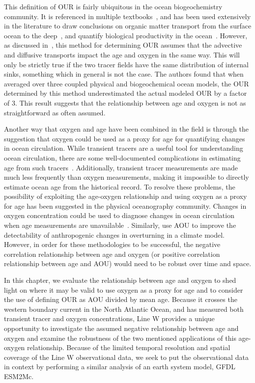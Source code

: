 This definition of OUR is fairly ubiquitous in the ocean biogeochemistry
community. It is referenced in multiple textbooks~\citep{Sarmiento2006,Emerson2008},
and has been used extensively in the literature to draw conclusions on organic
matter transport from the surface ocean to the deep~\citep{Jenkins}, and quantify
biological productivity in the ocean~\citep{Burd2010}. However, as discussed
in~\citet{Koeve2016}, this method for determining OUR assumes that the advective
and diffusive transports impact the age and oxygen in the same way. This will
only be strictly true if the two tracer fields have the same distribution of
internal sinks, something which in general is not the case. The authors found
that when averaged over three coupled physical and biogeochemical ocean models,
the OUR determined by this method underestimated the actual modeled OUR by a
factor of 3. This result suggests that the relationship between age and oxygen
is not as straightforward as often assumed.

Another way that oxygen and age have been combined in the field is through the
suggestion that oxygen could be used as a proxy for age for quantifying changes
in ocean circulation. While transient tracers are a useful tool for understanding
ocean circulation, there are some well-documented complications in estimating age
from such tracers~\citep{Haine2002}. Additionally, transient tracer
measurements are made much less frequently than oxygen measurements, making it
impossible to directly estimate ocean age from the historical record. To resolve
these problems, the possibility of exploiting the age-oxygen relationship and
using oxygen as a proxy for age has been suggested in the physical oceanography
community. Changes in oxygen concentration could be used to diagnose changes in
ocean circulation when age measurements are unavailable~\citep{Deutsch2005,Kwon2016}.
Similarly, \citet{Brennan2008} use AOU to improve the detectability of anthropogenic
changes in overturning in a climate model. However, in order for these methodologies
to be successful, the negative correlation relationship between age and oxygen
(or positive correlation relationship between age and AOU) would need to be robust
over time and space.

In this chapter, we evaluate the relationship between age and oxygen to shed
light on where it may be valid to use oxygen as a proxy for age and to consider
the use of defining OUR as AOU divided by mean age. Because it crosses the western
boundary current in the North Atlantic Ocean, and has measured both transient
tracer and oxygen concentrations, Line W provides a unique opportunity to
investigate the assumed negative relationship between age and oxygen and examine
the robustness of the two mentioned applications of this age-oxygen relationship.
Because of the limited temporal resolution and spatial coverage of the Line W
observational data, we seek to put the observational data in context by performing
a similar analysis of an earth system model, GFDL ESM2Mc.

